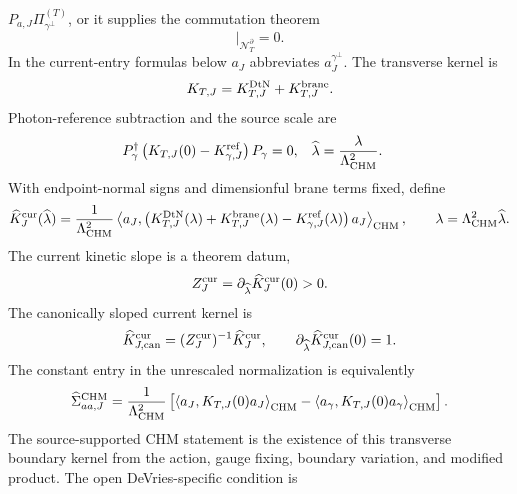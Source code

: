 \begin{widetext}
\(P_{a,J}\Pi_{\gamma^\perp}^{(T)}\), or it supplies the commutation theorem
\begin{equation}
  [P_{a,J},\Pi_{\gamma^\perp}^{(T)}]\big|_{\mathcal N_T^\partial}=0 .
  \label{eq:chm-admissible-projector-order}
\end{equation}
In the current-entry formulas below \(a_J\) abbreviates
\(a_J^{\gamma^\perp}\).  The transverse kernel is
\[
  K_{T,J}=K^{\rm DtN}_{T,J}+K^{\rm brane}_{T,J}.
\]
Photon-reference subtraction and the source scale are
\begin{align}
  P_\gamma^\dagger
  \left(K_{T,J}(0)-K_{\gamma,J}^{\rm ref}\right)
  P_\gamma
  &=
  0,
  &
  \widehat\lambda&=\frac{\lambda}{\Lambda_{\rm CHM}^2}.
  \label{eq:chm-admissible-reference-scale}
\end{align}
With endpoint-normal signs and dimensionful brane terms fixed, define
\begin{equation}
  \widehat K^{\rm cur}_J(\widehat\lambda)
  =
  \frac{1}{\Lambda_{\rm CHM}^2}
  \left\langle a_J,
  \left(
  K^{\rm DtN}_{T,J}(\lambda)
  +K^{\rm brane}_{T,J}(\lambda)
  -K_{\gamma,J}^{\rm ref}(\lambda)
  \right)a_J
  \right\rangle_{\rm CHM},
  \qquad
  \lambda=\Lambda_{\rm CHM}^2\widehat\lambda .
  \label{eq:chm-current-kernel}
\end{equation}
The current kinetic slope is a theorem datum,
\begin{equation}
  Z_J^{\rm cur}
  =
  \partial_{\widehat\lambda}\widehat K_J^{\rm cur}(0)>0.
  \label{eq:chm-current-Z-factor}
\end{equation}
The canonically sloped current kernel is
\begin{equation}
  \widehat K_{J,{\rm can}}^{\rm cur}
  =
  (Z_J^{\rm cur})^{-1}\widehat K_J^{\rm cur},
  \qquad
  \partial_{\widehat\lambda}\widehat K_{J,{\rm can}}^{\rm cur}(0)=1 .
  \label{eq:chm-current-canonical-kernel}
\end{equation}
The constant entry in the unrescaled normalization is equivalently
\begin{equation}
  \widehat\Sigma_{aa,J}^{\rm CHM}
  =
  \frac{1}{\Lambda_{\rm CHM}^2}
  \left[
  \left\langle a_J,K_{T,J}(0)a_J\right\rangle_{\rm CHM}
  -
  \left\langle a_\gamma,K_{T,J}(0)a_\gamma\right\rangle_{\rm CHM}
  \right].
  \label{eq:chm-current-entry-photon-subtracted}
\end{equation}
The source-supported CHM statement is the existence of this transverse
boundary kernel from the action, gauge fixing, boundary variation, and
modified product.  The open DeVries-specific condition is

\end{widetext}
